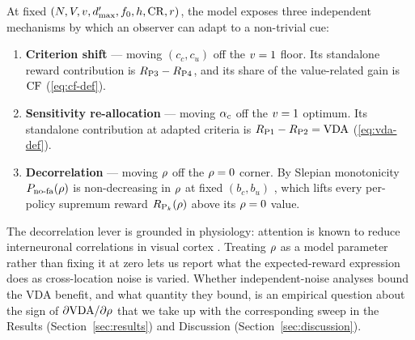 \begin{definition}
\label{def:three-levers}
At fixed $(N, V, v, d'_{\max}, f_0, h, \mathrm{CR}, r)$, the
model exposes three independent mechanisms by which an observer can
adapt to a non-trivial cue:
\begin{enumerate}
\item \textbf{Criterion shift} --- moving $(c_c, c_u)$ off the
  $v = 1$ floor. Its standalone reward contribution is
  $R_{\mathrm{P3}} - R_{\mathrm{P4}}$, and its share of the value-related gain is
  $\mathrm{CF}$ (\ref{eq:cf-def}).
\item \textbf{Sensitivity re-allocation} --- moving $\alpha_c$ off the
  $v = 1$ optimum. Its standalone contribution at adapted criteria is
  $R_{\mathrm{P1}} - R_{\mathrm{P2}} = \mathrm{VDA}$ (\ref{eq:vda-def}).
\item \textbf{Decorrelation} --- moving $\rho$ off the
  $\rho = 0$ corner. By Slepian monotonicity $P_{\mathrm{no\text{-}fa}}(\rho)$ is
  non-decreasing in $\rho$ at fixed $(b_c, b_u)$ \cite{Slepian1962},
  which lifts every per-policy supremum reward
  $R_{\mathrm{P}_k}(\rho)$ above its $\rho = 0$ value.
\end{enumerate}
\end{definition}

The decorrelation lever is grounded in physiology: attention is known to
reduce interneuronal correlations in visual cortex
\cite{CohenMaunsell2009, RuffCohen2016, Srinath2021}. Treating $\rho$
as a model parameter rather than fixing it at zero lets us report what
the expected-reward expression does as cross-location noise is varied.
Whether independent-noise analyses bound the VDA benefit, and what
quantity they bound, is an empirical question about the sign of
$\partial\mathrm{VDA}/\partial\rho$ that we take up with the corresponding
sweep in the Results (Section~\ref{sec:results}) and Discussion
(Section~\ref{sec:discussion}).
